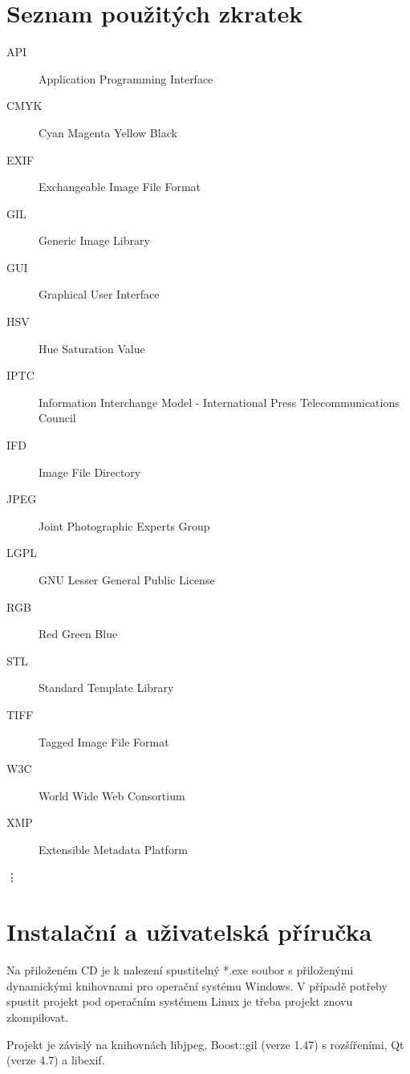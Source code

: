 \documentclass[11pt,twoside,a4paper]{book}
\begin{document}
\chapter{Seznam použitých zkratek}

\begin{description}
\item[API] Application Programming Interface
\item[CMYK] Cyan Magenta Yellow Black
\item[EXIF] Exchangeable Image File Format
\item[GIL] Generic Image Library
\item[GUI] Graphical User Interface
\item[HSV] Hue Saturation Value
\item[IPTC] Information Interchange Model - International Press Telecommunications Council
\item[IFD] Image File Directory
\item[JPEG] Joint Photographic Experts Group
\item[LGPL] GNU Lesser General Public License
\item[RGB] Red Green Blue
\item[STL] Standard Template Library
\item[TIFF] Tagged Image File Format
\item[W3C] World Wide Web Consortium
\item[XMP] Extensible Metadata Platform

\end{description}
\vdots

\chapter{Instalační a uživatelská příručka}
\noindent
Na přiloženém CD je k nalezení spustitelný *.exe soubor s přiloženými dynamickými knihovnami pro operační systému Windows. V případě potřeby spustit projekt pod operačním systémem Linux je třeba projekt znovu zkompilovat.

\indent
Projekt je závislý na knihovnách libjpeg, Boost::gil (verze 1.47) s rozšířeními, Qt (verze 4.7) a libexif.
\end{document}

